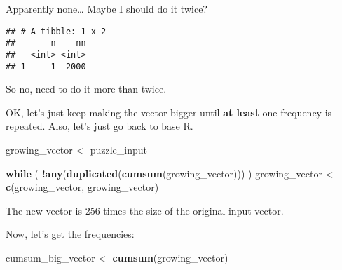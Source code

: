 \documentclass[]{book}
\newenvironment{Shaded}{\begin{snugshade}}{\end{snugshade}}
\newcommand{\KeywordTok}[1]{\textcolor[rgb]{0.13,0.29,0.53}{\textbf{#1}}}
\newcommand{\DataTypeTok}[1]{\textcolor[rgb]{0.13,0.29,0.53}{#1}}
\newcommand{\DecValTok}[1]{\textcolor[rgb]{0.00,0.00,0.81}{#1}}
\newcommand{\StringTok}[1]{\textcolor[rgb]{0.31,0.60,0.02}{#1}}
\newcommand{\ControlFlowTok}[1]{\textcolor[rgb]{0.13,0.29,0.53}{\textbf{#1}}}
\newcommand{\OperatorTok}[1]{\textcolor[rgb]{0.81,0.36,0.00}{\textbf{#1}}}
\newcommand{\NormalTok}[1]{#1}
\theoremstyle{definition}
\theoremstyle{definition}
\theoremstyle{definition}
\theoremstyle{remark}
\begin{document}
Apparently none\ldots{} Maybe I should do it twice?

\begin{Shaded}
\end{Shaded}

\begin{verbatim}
## # A tibble: 1 x 2
##       n    nn
##   <int> <int>
## 1     1  2000
\end{verbatim}

So no, need to do it more than twice.

OK, let's just keep making the vector bigger until \textbf{at least} one
frequency is repeated. Also, let's just go back to base R.

\begin{Shaded}
\begin{Highlighting}[]
\NormalTok{growing_vector <-}\StringTok{ }\NormalTok{puzzle_input}

\ControlFlowTok{while}\NormalTok{ ( }\OperatorTok{!}\KeywordTok{any}\NormalTok{(}\KeywordTok{duplicated}\NormalTok{(}\KeywordTok{cumsum}\NormalTok{(growing_vector))) ) }
\NormalTok{  growing_vector <-}\StringTok{ }\KeywordTok{c}\NormalTok{(growing_vector, growing_vector)}
\end{Highlighting}
\end{Shaded}

The new vector is 256 times the size of the original input vector.

Now, let's get the frequencies:

\begin{Shaded}
\begin{Highlighting}[]
\NormalTok{cumsum_big_vector <-}\StringTok{ }\KeywordTok{cumsum}\NormalTok{(growing_vector)}
\end{Highlighting}
\end{Shaded}
\end{document}
